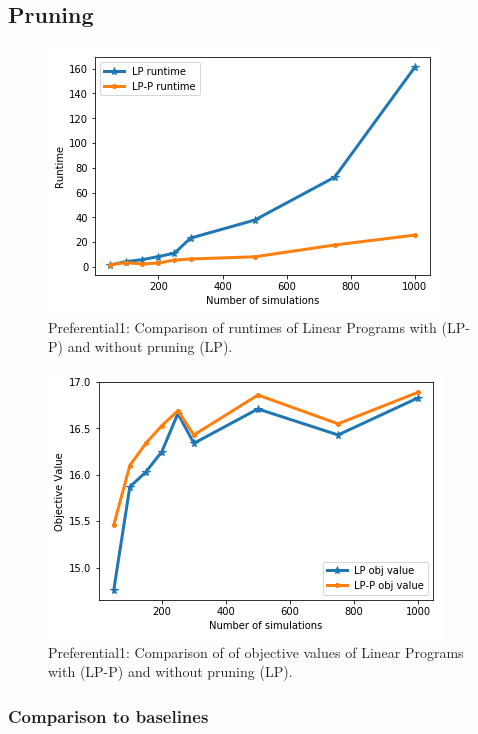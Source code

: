 \subsection{Pruning}
\begin{figure}[!h]
    \centering
    \includegraphics[scale = 0.55]{Figuresnew/pa1_runtime.png}
    \caption{Preferential1: Comparison of runtimes of Linear Programs with (LP-P) and without pruning (LP). }
    \label{fig:pa1pruningtime}
\end{figure}

\begin{figure}[!h]
    \centering
    \includegraphics[scale = 0.55]{Figuresnew/pa1_objpruning.png}
    \caption{Preferential1: Comparison of of objective values of Linear Programs with (LP-P) and without pruning (LP). }
    \label{fig:pa1pruningobj}
\end{figure}


\subsubsection{Comparison to baselines}

